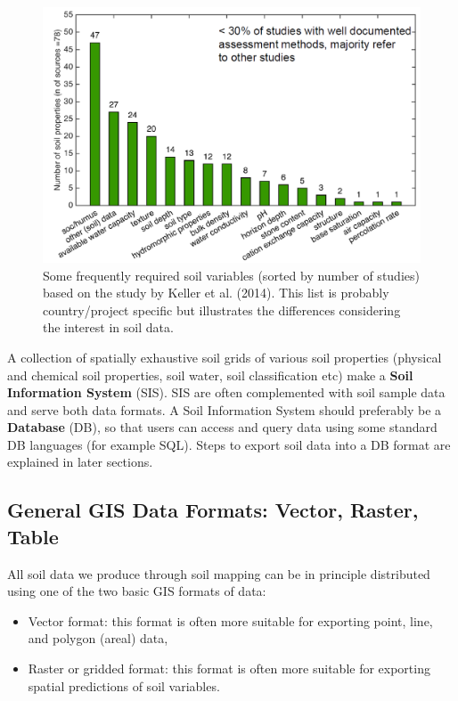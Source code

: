 \documentclass[10pt,b5paper,]{book}
\providecommand{\tightlist}{%
  \setlength{\itemsep}{0pt}\setlength{\parskip}{0pt}}
\theoremstyle{definition}
\theoremstyle{definition}
\theoremstyle{definition}
\theoremstyle{remark}
\begin{document}
\begin{figure}
\centering
\includegraphics{images/Data_sharing_soil_variables.png}
\caption{Some frequently required soil variables (sorted by number of
studies) based on the study by Keller et al. (2014). This list is
probably country/project specific but illustrates the differences
considering the interest in soil data.}
\end{figure}

A collection of spatially exhaustive soil grids of various soil
properties (physical and chemical soil properties, soil water, soil
classification etc) make a \textbf{Soil Information System} (SIS). SIS
are often complemented with soil sample data and serve both data
formats. A Soil Information System should preferably be a
\textbf{Database} (DB), so that users can access and query data using
some standard DB languages (for example SQL). Steps to export soil data
into a DB format are explained in later sections.

\hypertarget{general-gis-data-formats-vector-raster-table}{%
\subsection{General GIS Data Formats: Vector, Raster,
Table}\label{general-gis-data-formats-vector-raster-table}}

All soil data we produce through soil mapping can be in principle
distributed using one of the two basic GIS formats of data:

\begin{itemize}
\tightlist
\item
  Vector format: this format is often more suitable for exporting point,
  line, and polygon (areal) data,
\item
  Raster or gridded format: this format is often more suitable for
  exporting spatial predictions of soil variables.
\end{itemize}
\end{document}
